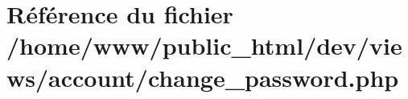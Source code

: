 \hypertarget{views_2account_2change__password_8php}{\section{Référence du fichier /home/www/public\-\_\-html/dev/views/account/change\-\_\-password.php}
\label{views_2account_2change__password_8php}
}
